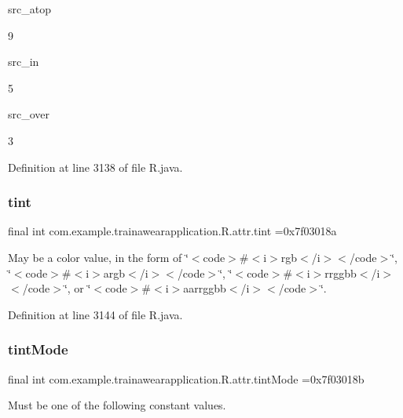 src\+\_\+atop

9

src\+\_\+in

5

src\+\_\+over

3

Definition at line 3138 of file R.\+java.

\mbox{\label{classcom_1_1example_1_1trainawearapplication_1_1_r_1_1attr_a8191a7e1f1ac4a0a44c4ae643ff15521}} 
\subsubsection{\texorpdfstring{tint}{tint}}
{\footnotesize\ttfamily final int com.\+example.\+trainawearapplication.\+R.\+attr.\+tint =0x7f03018a\hspace{0.3cm}{\ttfamily [static]}}

May be a color value, in the form of \char`\"{}$<$code$>$\#$<$i$>$rgb$<$/i$>$$<$/code$>$\char`\"{}, \char`\"{}$<$code$>$\#$<$i$>$argb$<$/i$>$$<$/code$>$\char`\"{}, \char`\"{}$<$code$>$\#$<$i$>$rrggbb$<$/i$>$$<$/code$>$\char`\"{}, or \char`\"{}$<$code$>$\#$<$i$>$aarrggbb$<$/i$>$$<$/code$>$\char`\"{}. 

Definition at line 3144 of file R.\+java.

\mbox{\label{classcom_1_1example_1_1trainawearapplication_1_1_r_1_1attr_a3b4186ffc1d83d1e162896b35873a5ee}} 
\subsubsection{\texorpdfstring{tintMode}{tintMode}}
{\footnotesize\ttfamily final int com.\+example.\+trainawearapplication.\+R.\+attr.\+tint\+Mode =0x7f03018b\hspace{0.3cm}{\ttfamily [static]}}

Must be one of the following constant values.

